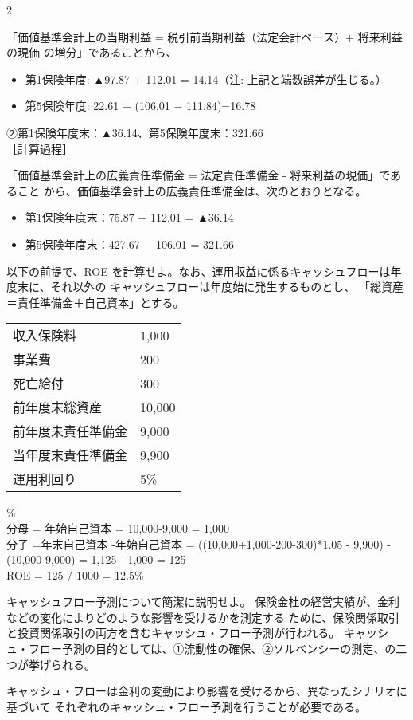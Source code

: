 2\documentclass[report,gutter=10mm,fore-edge=10mm,uplatex,dvipdfmx]{jlreq}
\begin{document}
「価値基準会計上の当期利益 = 税引前当期利益（法定会計べ一ス）+ 将来利益の現価
の増分」であることから、
\begin{itemize}
\item[]  第1保険年度: ▲97.87 + 112.01 = 14.14（注: 上記と端数誤差が生じる。）
\item[]  第5保険年度: 22.61  + (106.01 − 111.84)=16.78
\end{itemize}

②第1保険年度末：▲36.14、第5保険年度末：321.66\\
［計算過程］

「価値基準会計上の広義責任準備金 = 法定責任準備金 - 将来利益の現価」であること
から、価値基準会計上の広義責任準備金は、次のとおりとなる。
\begin{itemize}
\item[] 第1保険年度末：75.87  −  112.01 = ▲36.14
\item[] 第5保険年度末：427.67 − 106.01 = 321.66
\end{itemize}
以下の前提で、ROE を計算せよ。なお、運用収益に係るキャッシュフローは年度末に、それ以外の
キャッシュフローは年度始に発生するものとし、
「総資産＝責任準備金＋自己資本」とする。

\begin{tabular}{ll}
 収入保険料&1,000\\
 事業費&200\\
 死亡給付&300\\
 前年度末総資産&10,000\\
 前年度未責任準備金 &9,000\\
 当年度末責任準備金 &9,900\\
 運用利回り&5\%
\end{tabular}

\answer{}
\%\\
分母 = 年始自己資本 = 10,000-9,000 = 1,000\\
分子 =年末自己資本 -年始自己資本 = ((10,000+1,000-200-300)*1.05 - 9,900) - (10,000-9,000) = 1,125 - 1,000 = 125\\
ROE = 125 / 1000 = 12.5\%

キャッシュフロー予測について簡潔に説明せよ。
\answer{}
保険金杜の経営実績が、金利などの変化によりどのような影響を受けるかを測定する
ために、保険関係取引と投資関係取引の両方を含むキャッシュ・フロー予測が行われる。
キャッシュ・フロー予測の目的としては、①流動性の確保、②ソルベンシーの測定、の二
つが挙げられる。

キャッシュ・フローは金利の変動により影響を受けるから、異なったシナリオに基づいて
それぞれのキャッシュ・フロー予測を行うことが必要である。
\end{document}
